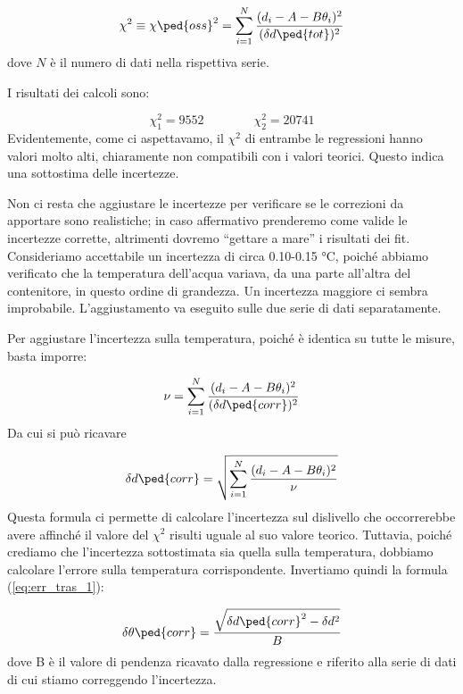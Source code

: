 \begin{equation}
    \chi^2 \equiv \chi\ped{oss}^2 = \sum_{i=1}^{N} \frac{(d_i - A - B\theta_i)^2}{(\delta d\ped{tot})^2}
\end{equation}
%
dove $N$ è il numero di dati nella rispettiva serie. 

I risultati dei calcoli sono:

\begin{equation}
    \chi_1^2 = 9552 \qquad \qquad \chi_2^2 = 20741
\end{equation}
%
Evidentemente, come ci aspettavamo, il $\chi^2$ di entrambe le regressioni hanno valori molto alti, chiaramente non compatibili con
i valori teorici. Questo indica una sottostima delle incertezze.

Non ci resta che aggiustare le incertezze per verificare se le correzioni da apportare sono realistiche; in caso affermativo
prenderemo come valide le incertezze corrette, altrimenti dovremo ``gettare a mare'' i risultati dei fit.
Consideriamo accettabile un incertezza di circa 0.10-0.15 \si{\celsius}, poiché abbiamo verificato che la temperatura dell'acqua
variava, da una parte all'altra del contenitore, in questo ordine di grandezza. Un incertezza maggiore ci sembra improbabile.
L'aggiustamento va eseguito sulle due serie di dati separatamente.

Per aggiustare l'incertezza sulla temperatura, poiché è identica su tutte le misure, basta imporre:

\begin{equation}
    \nu = \sum_{i=1}^{N} \frac{(d_i - A - B\theta_i)^2}{(\delta d\ped{corr})^2}
\end{equation}
%
Da cui si può ricavare

\begin{equation}
    \delta d\ped{corr} = \sqrt{\sum_{i=1}^{N} \frac{(d_i - A - B\theta_i)^2}{\nu}}
\end{equation}
%
Questa formula ci permette di calcolare l'incertezza sul dislivello che occorrerebbe avere affinché il valore del $\chi^2$
risulti uguale al suo valore teorico. Tuttavia, poiché crediamo che l'incertezza sottostimata sia quella sulla temperatura,
dobbiamo calcolare l'errore sulla temperatura corrispondente. Invertiamo quindi la formula (\ref{eq:err_tras_1}):

\begin{equation}
    \delta \theta\ped{corr} = \frac{\sqrt{\delta d\ped{corr}^2 - \delta d^2}}{B}
\end{equation}
%
dove B è il valore di pendenza ricavato dalla regressione e riferito alla serie di dati di cui stiamo correggendo l'incertezza.


